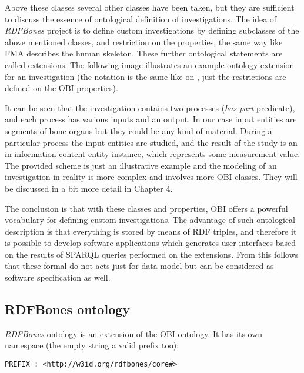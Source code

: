 Above these classes several other classes have been taken, but they are sufficient to discuss the essence of ontological definition of investigations. The idea of \textit{RDFBones} project is to define custom investigations by defining subclasses of the above mentioned classes, and restriction on the properties, the same way like FMA describes the human skeleton. These further ontological statements are called extensions. The following image illustrates an example ontology extension for an investigation (the notation is the same like on , just the restrictions are defined on the OBI properties). 


It can be seen that the investigation contains two processes (\textit{has part} predicate), and each process has various inputs and an output. In our case input entities are segments of bone organs but they could be any kind of material. During a particular process the input entities are studied, and the result of the study is an in information content entity instance, which represents some measurement value. The provided scheme is just an illustrative example and the modeling of an investigation in reality is more complex and involves more OBI classes. They will be discussed in a bit more detail in Chapter 4.

The conclusion is that with these classes and properties, OBI offers a powerful vocabulary for defining custom investigations. The advantage of such ontological description is that everything is stored by means of RDF triples, and therefore it is possible to develop software applications which generates user interfaces based on the results of SPARQL queries performed on the extensions. From this follows that these formal do not acts just for data model but can be considered as software specification as well.

\subsection{RDFBones ontology}

\textit{RDFBones} ontology is an extension of the OBI ontology. It has its own namespace (the empty string a valid prefix too): 

\begin{lstlisting}[basicstyle=\footnotesize, captionpos=b, caption=RDFBones namespace, label=lst:sparql, belowskip=1em, aboveskip=2em,
frame=single]
PREFIX : <http://w3id.org/rdfbones/core#>
\end{lstlisting}

